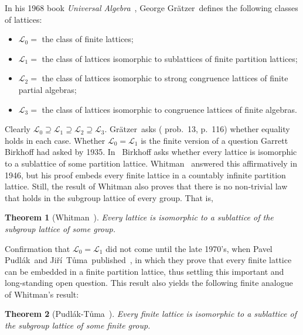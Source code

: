\documentclass[cm,dissertation]{uhthesis}
\theoremstyle{plain}
\newtheorem{theorem}{Theorem}[section]
\theoremstyle{definition}
\theoremstyle{remark}
\numberwithin{theorem}{section}
\numberwithin{claim}{chapter}
\numberwithin{equation}{section}
\numberwithin{conjecture}{chapter}
\newcommand{\indexTuma}{\index{T\r{u}ma, Ji\v{r}\'i}}
\newcommand{\Jiri}{Ji\v{r}\'i}
\newcommand{\Tuma}{T\r{u}ma}
\newcommand{\Pudlak}{Pudl\'ak}
\newcommand{\Gratzer}{Gr\"{a}tzer}
\newcommand{\<}{\ensuremath{\langle}}
\renewcommand{\>}{\ensuremath{\rangle}}
\newcommand{\0}{\ensuremath{\mathbf{0}}}
\newcommand{\1}{\ensuremath{\mathbf{1}}}
\newcommand{\2}{\ensuremath{\mathbf{2}}}
\newcommand{\3}{\ensuremath{\mathbf{3}}}
\newcommand{\4}{\ensuremath{\mathbf{4}}}
\newcommand{\5}{\ensuremath{\mathbf{5}}}
\newcommand{\sL}{\ensuremath{\mathscr{L}}}
\begin{document}
%
In his 1968 book {\it Universal Algebra}~\cite{Gratzer:1968}, George \Gratzer\ defines the
following classes of lattices:
\begin{itemize}
%
\item $\sL_0 =$ the class of finite lattices;
%
\item $\sL_1 =$ the class of lattices isomorphic to sublattices of finite partition lattices;
%
\item $\sL_2 =$ the class of lattices isomorphic to strong congruence lattices of
  finite partial algebras;
%
\item $\sL_3 =$ the class of lattices isomorphic to congruence lattices of finite algebras.
\end{itemize}
Clearly $\sL_0 \supseteq \sL_1 \supseteq \sL_2 \supseteq \sL_3$.
\Gratzer\ asks (\cite{Gratzer:1968} prob.~13, p.~116) whether equality holds
in each case. 
Whether $\sL_0 = \sL_1$ is the finite version of a question 
%
Garrett Birkhoff had asked by 1935.  
In~\cite{Birkhoff:1935} Birkhoff asks whether every lattice is isomorphic 
%
to a sublattice of some partition lattice.  Whitman~\cite{Whitman:1946} answered
this affirmatively in 1946, but his proof embeds every finite lattice in a countably
infinite partition lattice.  Still, the result of Whitman also proves that 
there is no non-trivial law that holds in the subgroup lattice of every group.
That is,
\begin{theorem}[Whitman~\cite{Whitman:1946}] Every lattice is isomorphic to a
  sublattice of the subgroup lattice of some group.
\end{theorem}
Confirmation that $\sL_0=\sL_1$ did not come until the late 1970's, when 
%
\indexTuma%
Pavel \Pudlak\ and \Jiri\ \Tuma\ published~\cite{Pudlak:1980}, in which they
prove that every finite lattice can be embedded in a finite partition lattice,
thus settling this important and long-standing open question.
This result also yields the following finite analogue of Whitman's result:
\begin{theorem}[\Pudlak-\Tuma~\cite{Pudlak:1980}]
Every finite lattice is isomorphic to a sublattice of the subgroup lattice of
some finite group.
\end{theorem}
\end{document}
